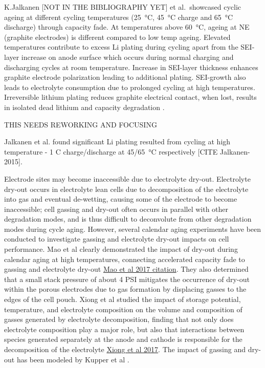 \documentclass{article}
\begin{document}
K.Jalkanen [NOT IN THE BIBLIOGRAPHY YET] et al.\ showcased cyclic ageing at different cycling temperatures (\SI{25}{\celsius}, \SI{45}{\celsius} charge and \SI{65}{\celsius} discharge) through capacity fade. At temperatures above \SI{60}{\celsius}, ageing at NE (graphite electrodes) is different compared to low temp ageing. Elevated temperatures contribute to excess Li plating during  cycling apart from the SEI-layer increase on anode surface which occurs during normal charging and discharging cycles at room temperature. Increase in SEI-layer thickness enhances graphite electrode polarization leading to additional plating. SEI-growth also leads to electrolyte consumption due to prolonged cycling at high temperatures. Irreversible lithium plating reduces graphite electrical contact, when lost, results in isolated dead lithium and capacity degradation \cite{petzl_lithium_2015}.  

THIS NEEDS REWORKING AND FOCUSING

Jalkanen et al. found significant Li plating resulted from cycling at high temperature - 1 C charge/discharge at \SI{45/65}{\celsius} respectively [CITE Jalkanen-2015]. 

Electrode sites may become inaccessible due to electrolyte dry-out. Electrolyte dry-out occurs in electrolyte lean cells due to decomposition of the electrolyte into gas and eventual de-wetting, causing some of the electrode to become inaccessible; cell gassing and dry-out often occurs in parallel with other degradation modes, and is thus difficult to deconvolute from other degradation modes during cycle aging. However, several calendar aging experiments have been conducted to investigate gassing and electrolyte dry-out impacts on cell performance. Mao et al clearly demonstrated the impact of dry-out during calendar aging at high temperatures, connecting accelerated capacity fade to gassing and electrolyte dry-out \href{https://iopscience.iop.org/article/10.1149/2.0241714jes}{Mao et al 2017 citation}. They also determined that a small stack pressure of about 4 PSI mitigates the occurrence of dry-out within the porous electrodes due to gas formation by displacing gasses to the edges of the cell pouch. Xiong et al studied the impact of storage potential, temperature, and electrolyte composition on the volume and composition of gasses generated by electrolyte decomposition, finding that not only does electrolyte composition play a major role, but also that interactions between species generated separately at the anode and cathode is responsible for the decomposition of the electrolyte \href{https://iopscience.iop.org/article/10.1149/2.1091702jes}{Xiong et al 2017}.
The impact of gassing and dry-out has been modeled by Kupper et al \cite{kupper_end--life_2018}.
\end{document}
